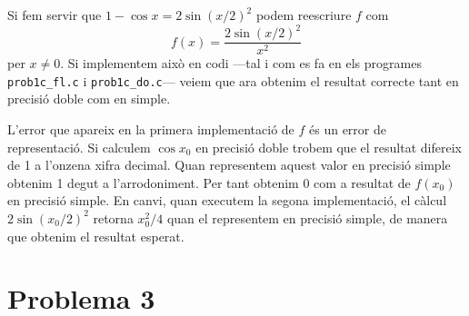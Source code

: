 \documentclass[12pt]{article}
\begin{document}
Si fem servir que \( 1 - \cos{x} = 2 \sin{(x/2)}^2 \) podem reescriure \( f \) com
\begin{equation*}
	f(x) = \dfrac{2\sin{(x/2)^2}}{x^2}
\end{equation*}
per \( x \neq 0 \). Si implementem això en codi ---tal i com es fa en els programes \texttt{prob1c\_fl.c} i \texttt{prob1c\_do.c}--- veiem que ara obtenim el resultat correcte tant en precisió doble com en simple.

L'error que apareix en la primera implementació de \( f \) és un error de representació. Si calculem \( \cos{x_0} \) en precisió doble trobem que el resultat difereix de 1 a l'onzena xifra decimal. Quan representem aquest valor en precisió simple obtenim 1 degut a l'arrodoniment. Per tant obtenim 0 com a resultat de \( f(x_0) \) en precisió simple. En canvi, quan executem la segona implementació, el càlcul \( 2\sin{(x_{0}/2)}^2 \) retorna \( x_{0}^2/4 \) quan el representem en precisió simple, de manera que obtenim el resultat esperat. 

\section*{Problema 3}
\end{document}
